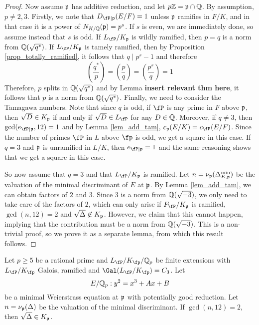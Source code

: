 \begin{proof}
    Now assume $\mathfrak{p}$ has additive reduction, and let $p\mathbb{Z}=\mathfrak{p}\cap\mathbb{Q}$. By assumption, $p\neq2,3$. Firstly, we note that $D_{\fP\mid\pp}(E/F)=1$ unless $\mathfrak{p}$ ramifies in $F/K$, and in that case it is a power of $N_{K/\mathbb{Q}}(\mathfrak{p})=p^s$. If $s$ is even, we are immediately done, so assume instead that $s$ is odd. If $L_\fP/K_\pp$ is wildly ramified, then $p=q$ is a norm from $\mathbb{Q}(\sqrt{q^*})$. If $L_\fP/K_\pp$ is tamely ramified, then by Proposition \ref{prop_totally_ramified}, it follows that $q\mid p^s-1$ and therefore 
    \begin{equation}
        \left(\frac{q^*}{p}\right)=\left(\frac{p}{q}\right)=\left(\frac{p^s}{q}\right)=1
    \end{equation}
    Therefore, $p$ splits in $\mathbb{Q}(\sqrt{q^*})$ and by Lemma \textbf{insert relevant thm here}, it follows that $p$ is a norm from $\mathbb{Q}(\sqrt{q^*})$. 
    Finally, we need to consider the Tamagawa numbers. Note that since $q$ is odd, if $\fP$ is any prime in $F$ above $\mathfrak{p}$, then $\sqrt{D}\in K_{\mathfrak{p}}$ if and only if $\sqrt{D}\in L_\fP$ for any $D\in\mathbb{Q}$. Moreover, if $q\neq 3$, then $\gcd(e_{\fP\mid\pp},12)=1$ and by Lemma \ref{lem_add_tam}, $c_\pp(E/K)=c_\fP(E/F)$. Since the number of primes $\fP$ in $L$ above $\fp$ is odd, we get a square in this case. If $q=3$ and $\mathfrak{p}$ is unramified in $L/K$, then $e_{\fP\mid\pp}=1$ and the same reasoning shows that we get a square in this case. 

    So now assume that $q=3$ and that $L_\fP/K_\pp$ is ramified. Let $n=\nu_{\mathfrak{p}}(\Delta_{E,\mathfrak{p}}^{\min})$ be the valuation of the minimal discriminant of $E$ at $\mathfrak{p}$. By Lemma \ref{lem_add_tam}, we can obtain factors of $2$ and $3$. Since $3$ is a norm from $\mathbb{Q}(\sqrt{-3})$, we only need to take care of the factors of $2$, which can only arise if $F_\fP/K_\pp$ is ramified, $\gcd(n,12)=2$ and $\sqrt{\Delta}\not\in K_{\mathfrak{p}}$. However, we claim that this cannot happen, implying that the contribution must be a norm from $\mathbb{Q}(\sqrt{-3})$. This is a non-trivial proof, so we prove it as a separate lemma, from which this result follows. 
\end{proof}

\begin{lemma}\label{lem_nottwo}
    Let $p\geq 5$ be a rational prime and $L_\fP/K_\fp/\QQ_p$ be finite extensions with $L_\fP/K_\fp$ Galois, ramified and $\Gal(L_\fP/K_\fp)=C_3$. Let $$E/\mathbb{Q}_p:y^2=x^3+Ax+B$$ be a minimal Weierstrass equation at $\mathfrak{p}$ with potentially good reduction. Let $n=\nu_{\mathfrak{p}}(\Delta)$ be the valuation of the minimal discriminant. If $\gcd(n,12)=2$, then $\sqrt{\Delta}\in K_{\mathfrak{p}}$.
\end{lemma}

